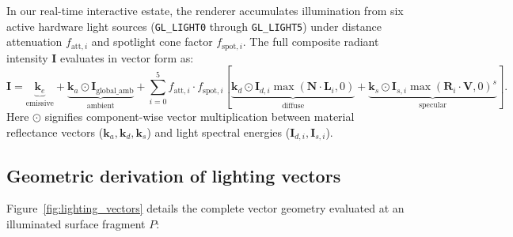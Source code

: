 \documentclass[10pt,a4paper,oneside]{article}
\begin{document}
In our real-time interactive estate, the renderer accumulates illumination from six active hardware light sources (\texttt{GL\_LIGHT0} through \texttt{GL\_LIGHT5}) under distance attenuation $f_{\text{att},i}$ and spotlight cone factor $f_{\text{spot},i}$. The full composite radiant intensity $\mathbf{I}$ evaluates in vector form as:
\begin{equation}
\mathbf{I} = \underbrace{\mathbf{k}_e}_{\text{emissive}} + \underbrace{\mathbf{k}_a \odot \mathbf{I}_{\text{global\_amb}}}_{\text{ambient}} + \sum_{i=0}^{5} f_{\text{att},i} \cdot f_{\text{spot},i} \left[ \underbrace{\mathbf{k}_d \odot \mathbf{I}_{d,i} \max(\mathbf{N} \cdot \mathbf{L}_i, 0)}_{\text{diffuse}} + \underbrace{\mathbf{k}_s \odot \mathbf{I}_{s,i} \max(\mathbf{R}_i \cdot \mathbf{V}, 0)^s}_{\text{specular}} \right].
\end{equation}
Here $\odot$ signifies component-wise vector multiplication between material reflectance vectors ($\mathbf{k}_a, \mathbf{k}_d, \mathbf{k}_s$) and light spectral energies ($\mathbf{I}_{d,i}, \mathbf{I}_{s,i}$).

\subsection{Geometric derivation of lighting vectors}
Figure~\ref{fig:lighting_vectors} details the complete vector geometry evaluated at an illuminated surface fragment $P$:
\end{document}
